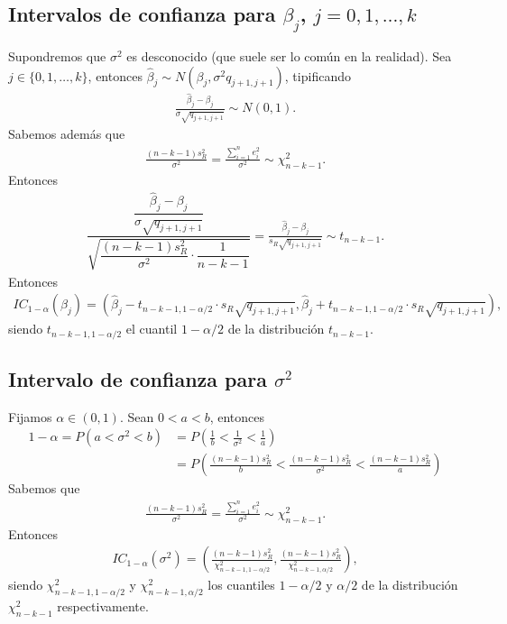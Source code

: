 \subsection{Intervalos de confianza para $\beta_j$, $j=0,1,\ldots,k$}
\noindent Supondremos que $\sigma^2$ es desconocido (que suele ser lo común en la realidad). Sea $j \in \{0,1,\ldots,k\}$, entonces $\widehat{\beta}_j \sim N(\beta_j, \sigma^2{q_{j+1,j+1}})$, tipificando
\begin{align*}
    \frac{\widehat{\beta}_j - \beta_j}{\sigma\sqrt{q_{j+1,j+1}}} \sim N(0,1).
\end{align*}
Sabemos además que
\begin{align*}
    \frac{(n-k-1)s_R^2}{\sigma^2} = \frac{\sum_{i=1}^{n} e_i^2}{\sigma^2} \sim \chi^2_{n-k-1}.
\end{align*}
Entonces
\begin{align*}
    \dfrac{\dfrac{\widehat{\beta}_j - \beta_j}{\sigma\sqrt{q_{j+1,j+1}}}}{\sqrt{\dfrac{(n-k-1)s_R^2}{\sigma^2} \cdot \dfrac{1}{n-k-1}}} = \frac{\widehat{\beta}_j - \beta_j}{s_R\sqrt{q_{j+1,j+1}}} \sim t_{n-k-1}.
\end{align*}
Entonces
\begin{align*}
    IC_{1-\alpha}(\beta_j) = \left( \widehat{\beta}_j - t_{n-k-1, 1 -\alpha/2} \cdot s_R \sqrt{q_{j+1,j+1}}, \widehat{\beta}_j + t_{n-k-1, 1 -\alpha/2} \cdot s_R \sqrt{q_{j+1,j+1}} \right),
\end{align*}
siendo $t_{n-k-1, 1 -\alpha/2}$ el cuantil $1 - \alpha/2$ de la distribución $t_{n-k-1}$.

\subsection{Intervalo de confianza para $\sigma^2$}
\noindent Fijamos $\alpha \in (0,1)$. Sean $0 < a < b$, entonces
\begin{align*}
    1 - \alpha = P(a < \sigma^2 < b) &= P\left( \frac{1}{b} < \frac{1}{\sigma^2} < \frac{1}{a}\right) \\
    &= P\left( \frac{(n-k-1)s^2_R}{b} < \frac{(n-k-1)s^2_R}{\sigma^2} < \frac{(n-k-1)s^2_R}{a}\right)
\end{align*}
Sabemos que
\begin{align*}
    \frac{(n-k-1)s^2_R}{\sigma^2} = \frac{\sum_{i=1}^{n} e_i^2}{\sigma^2} \sim \chi^2_{n-k-1}.
\end{align*}
Entonces
\begin{align*}
    IC_{1-\alpha}(\sigma^2) = \left( \frac{(n-k-1)s^2_R}{\chi^2_{n-k-1,1-\alpha/2}}, \frac{(n-k-1)s^2_R}{\chi^2_{n-k-1,\alpha/2}} \right),
\end{align*}
siendo $\chi^2_{n-k-1,1-\alpha/2}$ y $\chi^2_{n-k-1,\alpha/2}$ los cuantiles $1-\alpha/2$ y $\alpha/2$ de la distribución $\chi^2_{n-k-1}$ respectivamente.

